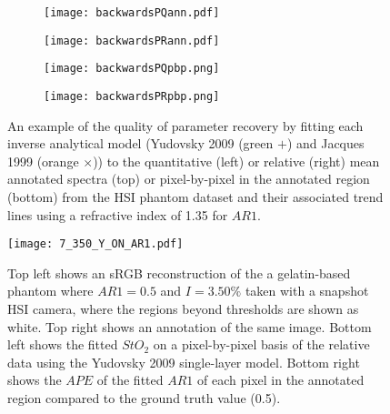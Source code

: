 \begin{figure}[h!]
    \centering
    \begin{subfigure}{0.49\textwidth}
        \texttt{[image: backwardsPQann.pdf]}
        \caption{}
        \label{fig:backwardsPQann}
    \end{subfigure}
    \begin{subfigure}{0.49\textwidth}
        \texttt{[image: backwardsPRann.pdf]}
        \caption{}
        \label{fig:backwardsPRann}
    \end{subfigure}
    \begin{subfigure}{0.49\textwidth}
        \texttt{[image: backwardsPQpbp.png]}
        \caption{}
        \label{fig:backwardsPQpbp}
    \end{subfigure}
    \begin{subfigure}{0.49\textwidth}
        \texttt{[image: backwardsPRpbp.png]}
        \caption{}
        \label{fig:backwardsPRpbp}
    \end{subfigure}
    \caption{An example of the quality of parameter recovery by fitting each inverse analytical model (Yudovsky 2009 (\textcolor{MyGreen}{green $+$}) and Jacques 1999 (\textcolor{MyOrange}{orange $\times$})) to the quantitative (left) or relative (right) mean annotated spectra (top) or pixel-by-pixel in the annotated region (bottom) from the HSI phantom dataset and their associated trend lines using a refractive index of 1.35 for $AR1$.}
    \label{fig:backwardsHSIphantomsann}
\end{figure}

\begin{figure}[h!]
    \centering 
    \texttt{[image: 7\_350\_Y\_ON\_AR1.pdf]}
    \caption{Top left shows an sRGB reconstruction of the a gelatin-based phantom where $AR1=0.5$ and $I=3.50\%$ taken with a snapshot HSI camera, where the regions beyond thresholds are shown as white. Top right shows an annotation of the same image. Bottom left shows the fitted $StO_2$ on a pixel-by-pixel basis of the relative data using the Yudovsky 2009 single-layer model. Bottom right shows the $APE$ of the fitted $AR1$ of each pixel in the annotated region compared to the ground truth value (0.5).}
    \label{fig:gelatinpbpeg}
\end{figure}

\FloatBarrier
